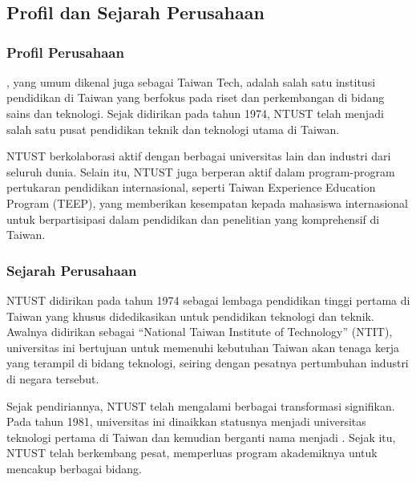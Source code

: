 \chapter{\babDua}

\section{Profil dan Sejarah Perusahaan}

\subsection{Profil Perusahaan}
\namaUniv, yang umum dikenal juga sebagai Taiwan Tech, adalah salah satu institusi pendidikan di Taiwan yang berfokus pada riset dan perkembangan di bidang sains dan teknologi. Sejak didirikan pada tahun 1974, NTUST telah menjadi salah satu pusat pendidikan teknik dan teknologi utama di Taiwan.

NTUST berkolaborasi aktif dengan berbagai universitas lain dan industri dari seluruh dunia. Selain itu, NTUST juga berperan aktif dalam program-program pertukaran pendidikan internasional, seperti Taiwan Experience Education Program (TEEP), yang memberikan kesempatan kepada mahasiswa internasional untuk berpartisipasi dalam pendidikan dan penelitian yang komprehensif di Taiwan.

\subsection{Sejarah Perusahaan}
NTUST didirikan pada tahun 1974 sebagai lembaga pendidikan tinggi pertama di Taiwan yang khusus didedikasikan untuk pendidikan teknologi dan teknik. Awalnya didirikan sebagai ``National Taiwan Institute of Technology'' (NTIT), universitas ini bertujuan untuk memenuhi kebutuhan Taiwan akan tenaga kerja yang terampil di bidang teknologi, seiring dengan pesatnya pertumbuhan industri di negara tersebut.

Sejak pendiriannya, NTUST telah mengalami berbagai transformasi signifikan. Pada tahun 1981, universitas ini dinaikkan statusnya menjadi universitas teknologi pertama di Taiwan dan kemudian berganti nama menjadi \namaUniv. Sejak itu, NTUST telah berkembang pesat, memperluas program akademiknya untuk mencakup berbagai bidang.

